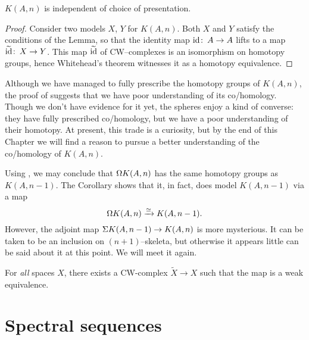 \begin{corollary}
$K(A, n)$ is independent of choice of presentation.
\end{corollary}
\begin{proof}
Consider two models $X$, $Y$ for $K(A, n)$.
Both $X$ and $Y$ satisfy the conditions of the Lemma, so that the identity map $\operatorname{id}\colon\thinspace A \to A$ lifts to a map $\widetilde{\operatorname{id}}\colon\thinspace X \to Y$.
This map $\widetilde{\operatorname{id}}$ of CW--complexes is an isomorphism on homotopy groups, hence Whitehead's theorem witnesses it as a homotopy equivalence.
\end{proof}

\begin{remark}
Although we have managed to fully prescribe the homotopy groups of $K(A, n)$, the proof of  suggests that we have poor understanding of its co/homology.
Though we don't have evidence for it yet, the spheres enjoy a kind of converse: they have fully prescribed co/homology, but we have a poor understanding of their homotopy.
At present, this trade is a curiosity, but by the end of this Chapter we will find a reason to pursue a better understanding of the co/homology of $K(A, n)$.
\end{remark}

\begin{remark}\label{ShiftingEMSpaces}
Using , we may conclude that $\Omega K(A, n)$ has the same homotopy groups as $K(A, n-1)$.
The Corollary shows that it, in fact, does model $K(A, n-1)$ via a map \[\Omega K(A, n) \xrightarrow\simeq K(A, n-1).\]
However, the adjoint map $\Sigma K(A, n-1) \to K(A, n)$ is more mysterious.
It can be taken to be an inclusion on $(n+1)$--skeleta, but otherwise it appears little can be said about it at this point.
We will meet it again.
\end{remark}

\begin{remark}
For \emph{all} spaces $X$, there exists a CW-complex $\widetilde X \to X$ such that the map is a weak equivalence.
\end{remark}




\section{Spectral sequences}\label{SpectralSequenceSection}

